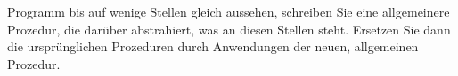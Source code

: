   Programm bis auf wenige Stellen gleich aussehen, schreiben Sie
  eine allgemeinere Prozedur, die darüber abstrahiert, was an diesen
  Stellen steht.  Ersetzen Sie dann die ursprünglichen Prozeduren durch
  Anwendungen der neuen, allgemeinen Prozedur.
